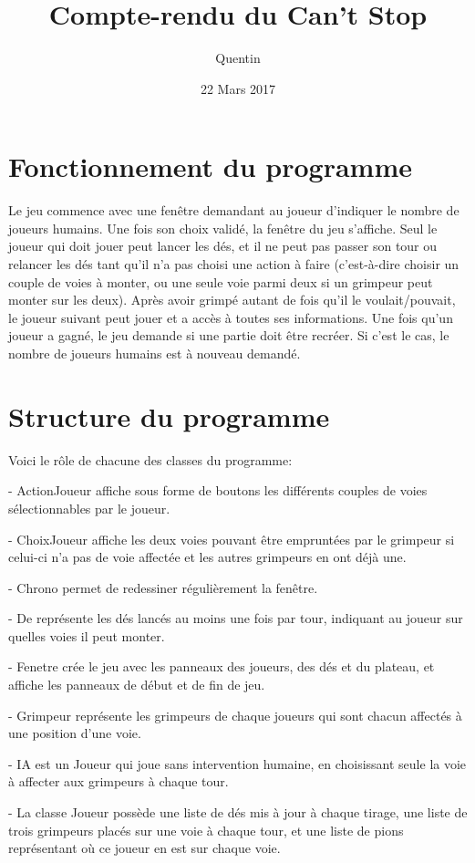 \documentclass{report}
\title{Compte-rendu du Can't Stop}
\author{Quentin \bsc{SAUVAGE}}
\date{22 Mars 2017}
\begin{document}
\maketitle
\chapter{Fonctionnement du programme}
Le jeu commence avec une fenêtre demandant au joueur d'indiquer le nombre de joueurs humains. Une fois son choix validé, la fenêtre du jeu s'affiche. Seul le joueur qui doit jouer peut lancer les dés, et il ne peut pas passer son tour ou relancer les dés tant qu'il n'a pas choisi une action à faire (c'est-à-dire choisir un couple de voies à monter, ou une seule voie parmi deux si un grimpeur peut monter sur les deux). Après avoir grimpé autant de fois qu'il le voulait/pouvait, le joueur suivant peut jouer et a accès à toutes ses informations. Une fois qu'un joueur a gagné, le jeu demande si une partie doit être recréer. Si c'est le cas, le nombre de joueurs humains est à nouveau demandé.

\chapter{Structure du programme}

Voici le rôle de chacune des classes du programme:

- ActionJoueur affiche sous forme de boutons les différents couples de voies sélectionnables par le joueur.

- ChoixJoueur affiche les deux voies pouvant être empruntées par le grimpeur si celui-ci n'a pas de voie affectée et les autres grimpeurs en ont déjà une.

- Chrono permet de redessiner régulièrement la fenêtre.

- De représente les dés lancés au moins une fois par tour, indiquant au joueur sur quelles voies il peut monter.

- Fenetre crée le jeu avec les panneaux des joueurs, des dés et du plateau,  et affiche les panneaux de début et de fin de jeu.

- Grimpeur représente les grimpeurs de chaque joueurs qui sont chacun affectés à une position d'une voie.

- IA est un Joueur qui joue sans intervention humaine, en choisissant seule la voie à affecter aux grimpeurs à chaque tour.

- La classe Joueur possède une liste de dés mis à jour à chaque tirage, une liste de trois grimpeurs placés sur une voie à chaque tour, et une liste de pions représentant où ce joueur en est sur chaque voie.
\end{document}
